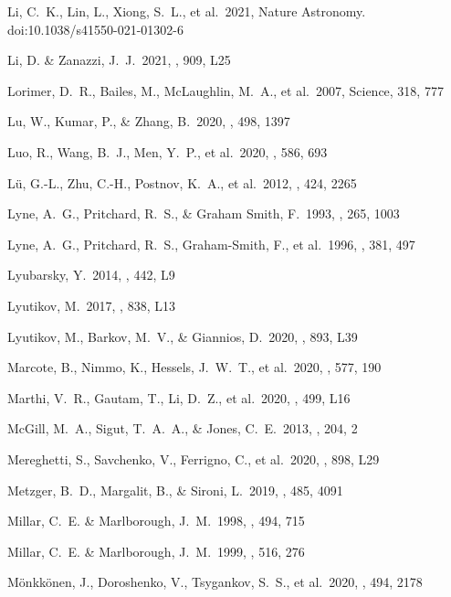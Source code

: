\documentclass[twocolumn]{aastex62}
\begin{document}
\begin{thebibliography}
 Li, C.~K., Lin, L., Xiong, S.~L., et al.\ 2021, Nature Astronomy. doi:10.1038/s41550-021-01302-6

 Li, D. \& Zanazzi, J.~J.\ 2021, \apjl, 909, L25

 Lorimer, D.~R., Bailes, M., McLaughlin, M.~A., et al.\ 2007, Science, 318, 777

 Lu, W., Kumar, P., \& Zhang, B.\ 2020, \mnras, 498, 1397

 Luo, R., Wang, B.~J., Men, Y.~P., et al.\ 2020, \nat, 586, 693

 L{\"u}, G.-L., Zhu, C.-H., Postnov, K.~A., et al.\ 2012, \mnras, 424, 2265

 Lyne, A.~G., Pritchard, R.~S., \& Graham Smith, F.\ 1993, \mnras, 265, 1003

 Lyne, A.~G., Pritchard, R.~S., Graham-Smith, F., et al.\ 1996, \nat, 381, 497

 Lyubarsky, Y.\ 2014, \mnras, 442, L9

 Lyutikov, M.\ 2017, \apjl, 838, L13

 Lyutikov, M., Barkov, M.~V., \& Giannios, D.\ 2020, \apjl, 893, L39

 Marcote, B., Nimmo, K., Hessels, J.~W.~T., et al.\ 2020, \nat, 577, 190

  Marthi, V.~R., Gautam, T., Li, D.~Z., et al.\ 2020, \mnras, 499, L16

 McGill, M.~A., Sigut, T.~A.~A., \& Jones, C.~E.\ 2013, \apjs, 204, 2

 Mereghetti, S., Savchenko, V., Ferrigno, C., et al.\ 2020, \apjl, 898, L29

 Metzger, B.~D., Margalit, B., \& Sironi, L.\ 2019, \mnras, 485, 4091

 Millar, C.~E. \& Marlborough, J.~M.\ 1998, \apj, 494, 715

 Millar, C.~E. \& Marlborough, J.~M.\ 1999, \apj, 516, 276

 M{\"o}nkk{\"o}nen, J., Doroshenko, V., Tsygankov, S.~S., et al.\ 2020, \mnras, 494, 2178


\end{thebibliography}
\end{document}
